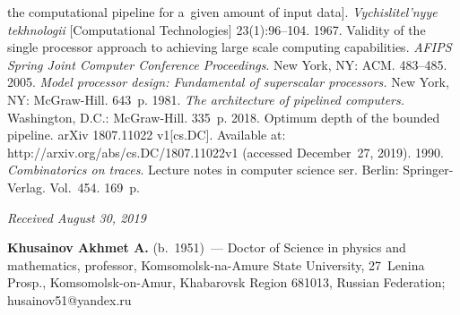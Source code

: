 \begin{multicols}{2}
{{\begin{thebibliography}{99}
the computational pipeline for a~given amount of input data]. 
\textit{Vychislitel'nyye tekhnologii} [Computational Technologies]  
23(1):96--104.
 1967. Validity of the single processor approach to 
achieving large scale computing capabilities. \textit{AFIPS Spring Joint 
Computer Conference Proceedings}. New York, NY: ACM. 483--485.
 2005. \textit{Model processor design: 
Fundamental of superscalar processors.} New York, NY: McGraw-Hill. 643~p.
 1981. \textit{The architecture of pipelined computers.} 
Washington, D.C.: McGraw-Hill. 335~p.
 2018. Optimum depth of the bounded pipeline. 
{arXiv} 1807.11022 v1[cs.DC]. Available at: {\sf 
http://arxiv.org/abs/cs.DC/1807.11022v1} (accessed December~27, 2019).
 1990. \textit{Combinatorics on traces}. Lecture notes in 
computer science ser. Berlin: Springer-Verlag. Vol.~454. 169~p.
\end{thebibliography}

 }
 }

\end{multicols}


\hfill{\small\textit{Received August 30, 2019}}



\Contrl

\noindent
\textbf{Khusainov Akhmet A.} (b.\ 1951)~--- Doctor of Science in physics and 
mathematics, professor, Komsomolsk-na-Amure State University, 27~Lenina 
Prosp., Komsomolsk-on-Amur, Khabarovsk Region 681013, Russian 
Federation; \mbox{husainov51@yandex.ru}




\label{end\stat}

\renewcommand{\bibname}{\protect\rm Литература} 